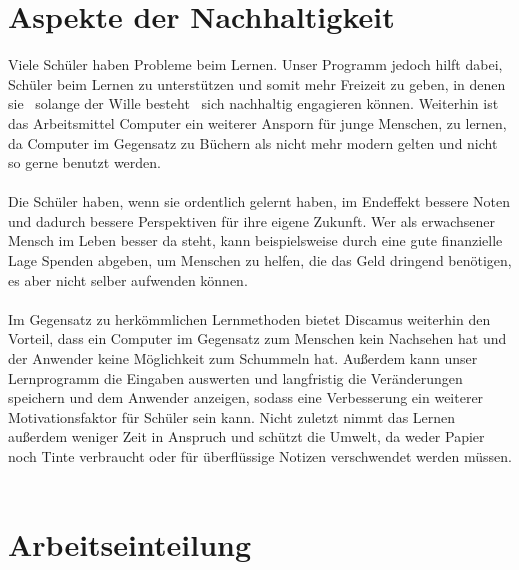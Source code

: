 \documentclass[a4paper, 11pt, titlepage]{article}
\begin{document}
\section{Aspekte der Nachhaltigkeit}
Viele Schüler haben Probleme beim Lernen. Unser Programm jedoch hilft dabei, Schüler beim Lernen zu unterstützen und somit mehr Freizeit zu geben, in denen sie \textendash\ solange der Wille besteht \textendash\ sich nachhaltig engagieren können. Weiterhin ist das Arbeitsmittel Computer ein weiterer Ansporn für junge Menschen, zu lernen, da Computer im Gegensatz zu Büchern als nicht mehr modern gelten und nicht so gerne benutzt werden.\\\\
Die Schüler haben, wenn sie ordentlich gelernt haben, im Endeffekt bessere Noten und dadurch bessere Perspektiven für ihre eigene Zukunft. Wer als erwachsener Mensch im Leben besser da steht, kann beispielsweise durch eine gute finanzielle Lage Spenden abgeben, um Menschen zu helfen, die das Geld dringend benötigen, es aber nicht selber aufwenden können.\\\\
Im Gegensatz zu herkömmlichen Lernmethoden bietet Discamus weiterhin den Vorteil, dass ein Computer im Gegensatz zum Menschen kein Nachsehen hat und der Anwender keine Möglichkeit zum Schummeln hat. Außerdem kann unser Lernprogramm die Eingaben auswerten und langfristig die Veränderungen speichern und dem Anwender anzeigen, sodass eine Verbesserung ein weiterer Motivationsfaktor für Schüler sein kann. Nicht zuletzt nimmt das Lernen außerdem weniger Zeit in Anspruch und schützt die Umwelt, da weder Papier noch Tinte verbraucht oder für überflüssige Notizen verschwendet werden müssen.\\\\

\section{Arbeitseinteilung}
\end{document}
